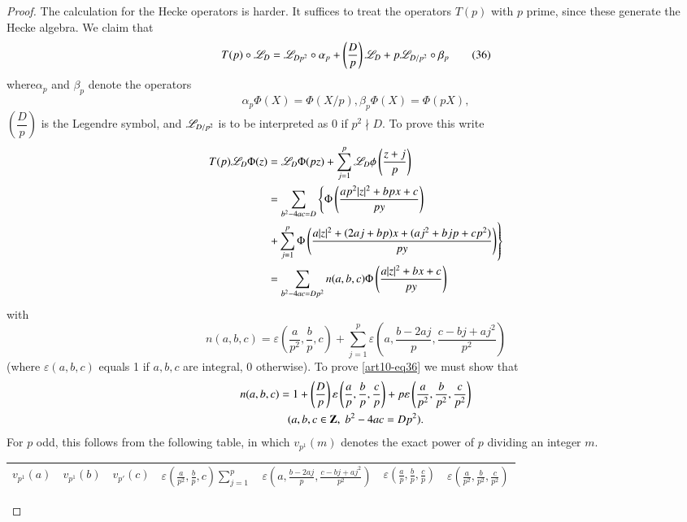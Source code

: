 \begin{proof}
The calculation for the Hecke operators is harder. It suffices to treat the operators $T(p)$ with $p$ prime, since these generate the Hecke algebra. We claim that 
\begin{equation*}
T (p) \circ \mathscr{L}_D =\mathscr{L}_{Dp^2} \circ  \alpha_p + \left(\frac{D}{p} \right) \mathscr{L}_D + p\mathscr{L}_{D/p^2} \circ \beta_p
\tag{36} \label{art10-eq36}
\end{equation*}
where\pageoriginale $\alpha_p$ and $\beta_p$ denote the operators
$$
\alpha_p \Phi (X) = \Phi (X/ p), \beta_p \Phi (X) = \Phi (pX),
$$
$\left(\dfrac{D}{p} \right)$ is the Legendre symbol, and $\mathscr{L}_{D/p^2}$ is to be interpreted as 0 if $p^2 \nmid D$.  To prove this write
\begin{align*}
T (p) \mathscr{L}_D \Phi (z) & = \mathscr{L}_D \Phi (pz) + \sum\limits^p_{j=1} \mathscr{L}_D \phi \left(\frac{z+j}{p} \right)\\
& = \sum\limits_{b^2 - 4 a c = D} \left\{\Phi \left(\frac{ap^2 |z|^2 + bpx + c}{py} \right) \right.\\
&\left.  + \sum\limits^p_{j=1} \Phi \left(\frac{a|z|^2 + (2aj + bp) x + (aj^2 + b jp + cp^2)}{py} \right) \right\}\\
& = \sum\limits_{b^2 - 4 a c = D p^2} n(a, b, c) \Phi \left(\frac{a|z|^2 + b x+ c}{py} \right)
\end{align*}
with 
$$
n (a, b, c) = \varepsilon \left(\frac{a}{p^2}, \frac{b}{p}, c \right) + \sum\limits^p_{j=1} \varepsilon \left(a, \frac{b - 2 aj}{p}, \frac{c-bj+ aj^2}{p^2} \right)
$$
(where $\varepsilon (a, b, c)$ equals 1 if $a, b, c$ are integral, 0 otherwise). To prove \eqref{art10-eq36} we must show that 
\begin{gather*}
n (a, b, c) = 1+ \left(\frac{D}{p} \right) \varepsilon \left(\frac{a}{p}, \frac{b}{p}, \frac{c}{p} \right) + p \varepsilon \left(\frac{a}{p^2}, \frac{b}{p^2}, \frac{c}{p^2} \right)\\
(a, b, c \in \mathbf{Z}, \; b^2 - 4 a c = Dp^2).
\end{gather*}
For $p$ odd, this follows from the following table, in which $v_{p^1} (m)$ denotes the exact power of $p$ dividing an integer $m$.
\begin{center}
{\fontsize{9}{11}\selectfont
\renewcommand{\arraystretch}{1.2}
\tabcolsep=3pt
\begin{tabular}{ccc|cccc}
$v_{p^1} (a)$ & $v_{p^1}(b)$ & $v_{p'}(c)$ & $\varepsilon \left(\frac{a}{p^2}, \frac{b}{p}, c \right) \sum\limits^p_{j=1} $  & $\varepsilon \left(a, \frac{b - 2 a j}{p} , \frac{c - bj + aj^2}{p^2}\right)$  & $\varepsilon\left(\frac{a}{p}, \frac{b}{p}, \frac{c}{p} \right) $ & $\varepsilon \left(\frac{a}{p^2}, \frac{b}{p^2}, \frac{c}{p^2} \right)$\\\hline

\end{tabular}}
\end{center}
\end{proof}
